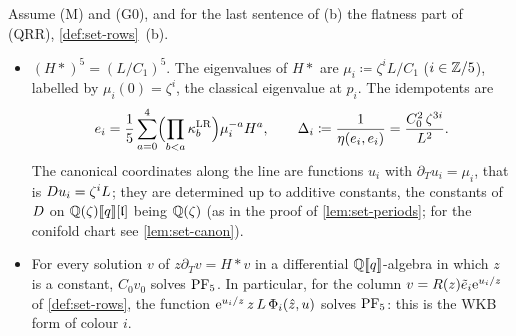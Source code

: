 
\begin{cor}
\label{cor:set-cyclicPF5}
Assume (M) and (G0), and for the last sentence of (b) the flatness part of (QRR), \cref{def:set-rows}~(b).
\begin{itemize}
\item[(a)] $(H*)^5=(L/C_1)^5$. The eigenvalues of $H*$ are $\mu_i\coloneqq\zeta^iL/C_1$ ($i\in\mathbb{Z}/5$), labelled by $\mu_i(0)=\zeta^i$, the classical eigenvalue at $p_i$. The idempotents are
\[
e_i=\frac15\sum_{a=0}^4\Bigl(\prod_{b<a}\kappa^{\mathrm{LR}}_b\Bigr)\mu_i^{-a}H^a,\qquad\Delta_i\coloneqq\frac1{\eta(e_i,e_i)}=\frac{C_0^2\,\zeta^{3i}}{L^2}.
\]
The canonical coordinates along the line are functions $u_i$ with $\partial_Tu_i=\mu_i$, that is $D u_i=\zeta^iL$; they are determined up to additive constants, the constants of $D$ on $\mathbb{Q}(\zeta)[\![ q ]\!][\mathfrak{l}]$ being $\mathbb{Q}(\zeta)$ (as in the proof of \cref{lem:set-periods}; for the conifold chart see \cref{lem:set-canon}).
\item[(b)] For every solution $v$ of $z\partial_Tv=H*v$ in a differential $\mathbb{Q}[\![ q ]\!]$-algebra in which $z$ is a constant, $C_0v_0$ solves $\mathrm{PF}_{5}$. In particular, for the column $v=R(z)\tilde e_i\mathrm{e}^{u_i/z}$ of \cref{def:set-rows}, the function $\mathrm{e}^{u_i/z}\,z\,L\,\Phi_i(\hat{z},u)$ solves $\mathrm{PF}_{5}$: this is the WKB form of colour $i$.
\end{itemize}
\end{cor}

